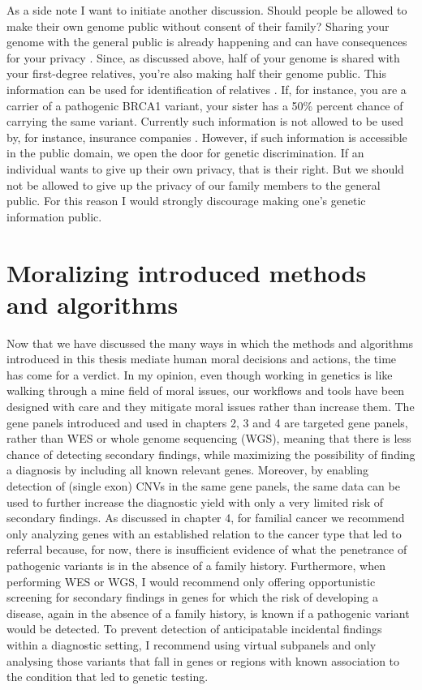 As a side note I want to initiate another discussion. 
Should people be allowed to make their own genome public without consent of their family? 
Sharing your genome with the general public is already happening and can have consequences for your privacy \cite{Smith_2017b}. 
Since, as discussed above, half of your genome is shared with your first-degree relatives, you’re also making half their genome public. 
This information can be used for identification of relatives \cite{Kim_2018,Erlich_2018}. 
If, for instance, you are a carrier of a pathogenic BRCA1 variant, your sister has a 50\% percent chance of carrying the same variant. 
Currently such information is not allowed to be used by, for instance, insurance companies \cite{Bin_2018}. 
However, if such information is accessible in the public domain, we open the door for genetic discrimination. 
If an individual wants to give up their own privacy, that is their right. 
But we should not be allowed to give up the privacy of our family members to the general public. For this reason I would strongly discourage making one’s genetic information public. 

\section{Moralizing introduced methods and algorithms}
Now that we have discussed the many ways in which the methods and algorithms introduced in this thesis mediate human moral decisions and actions, the time has come for a verdict. 
In my opinion, even though working in genetics is like walking through a mine field of moral issues, our workflows and tools have been designed with care and they mitigate moral issues rather than increase them. 
The gene panels introduced and used in chapters 2, 3 and 4 are targeted gene panels, rather than WES or whole genome sequencing (WGS), meaning that there is less chance of detecting secondary findings, while maximizing the possibility of finding a diagnosis by including all known relevant genes.
Moreover, by enabling detection of (single exon) CNVs in the same gene panels, the same data can be used to further increase the diagnostic yield with only a very limited risk of secondary findings. 
As discussed in chapter 4, for familial cancer we recommend only analyzing genes with an established relation to the cancer type that led to referral because, for now, there is insufficient evidence of what the penetrance of pathogenic variants is in the absence of a family history. 
Furthermore, when performing WES or WGS, I would recommend only offering opportunistic screening for secondary findings in genes for which the risk of developing a disease, again in the absence of a family history, is known if a pathogenic variant would be detected. 
To prevent detection of anticipatable incidental findings within a diagnostic setting, I recommend using virtual subpanels and only analysing those variants that fall in genes or regions with known association to the condition that led to genetic testing.

